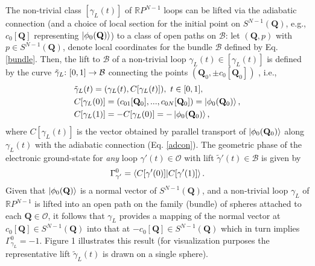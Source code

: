 \documentclass[superscriptaddress,showpacs,amsmath,amssymb,pra,twocolumn]{revtex4-1}
\begin{document}
The non-trivial class $[\gamma_{L}(t)]$ of $\mathbb{R}P^{N-1}$ loops
can be lifted via the adiabatic connection (and a choice of local
section for the initial point on $S^{N-1}(\mathbf{Q})$, e.g., $c_{0}[\mathbf{Q}]$
representing $\ket{\phi_{0}(\mathbf{Q})}$) to a class of open paths
on $\mathcal{B}$: let $(\mathbf{Q},p)$ with $p \in S^{N-1}(\mathbf{Q})$,
denote local coordinates for the bundle $\mathcal{B}$ defined by
Eq. \ref{bundle}. Then, the lift to $\mathcal{B}$ of a non-trivial loop $\gamma_{L}(t) \in [\gamma_{L}(t)]$ is defined by the curve $\text{\ensuremath{\tilde{\gamma}_{L}}:}~[0,1]\rightarrow\mathcal{B}$
connecting the points $(\mathbf{Q}_{0},\pm c_{0}[\mathbf{Q}_{0}])$
\cite{nakahara2003geometry,lee2010introduction}, i.e., 
\begin{align}
 & \tilde{\gamma}_{L}(t)=(\gamma_{L}(t),C[\gamma_{L}(t)]),~t\in[0,1],\nonumber \\
 & C[\gamma_{L}(0)]=(c_{01}[\mathbf{Q}_{0}],...,c_{0N}[\mathbf{Q}_{0}])=\ket{\phi_{0}(\mathbf{Q}_{0})},\nonumber \\
 & C[\gamma_{L}(1)]=-C[\gamma_{L}(0)]=-\ket{\phi_{0}(\mathbf{Q}_{0})},\label{loop}
\end{align}
where $C[\gamma_{L}(t)]$ is the vector obtained by parallel transport
of $\ket{\phi_{0}(\mathbf{Q}_{0})}$ along $\gamma_{L}(t)$ with the
adiabatic connection (Eq. \ref{adcon}). The geometric phase of the
electronic ground-state for \textit{any} loop $\gamma'(t)\in\mathcal{O}$
with lift $\tilde{\gamma}'(t)\in\mathcal{B}$ is given by \cite{berry_quantal_1984, ceulemans_berry_1991, mead_geometric_1992}
\begin{equation}
\Gamma_{\gamma'}^{0}=\braket{C[\gamma'(0)]|C[\gamma'(1)]}.
\end{equation}
Given that $\ket{\phi_{0}(\mathbf{Q})}$ is a normal vector of $S^{N-1}(\mathbf{Q})$,
and a non-trivial loop $\gamma_{L}$ of $\mathbb{R}P^{N-1}$ is lifted
into an open path on the family (bundle) of spheres attached to each $\mathbf{Q}\in\mathcal{O}$,
it follows that $\gamma_{L}$ provides a mapping of the normal vector
at $c_{0}[\mathbf{Q}]\in S^{N-1}(\mathbf{Q})$ into that at $-c_{0}[\mathbf{Q}]\in S^{N-1}(\mathbf{Q})$
which in turn implies $\Gamma_{\gamma_{L}}^{0}=-1$. Figure 1 illustrates
this result (for visualization purposes the representative lift $\tilde{\gamma}_{L}(t)$
is drawn on a single sphere).
\end{document}

